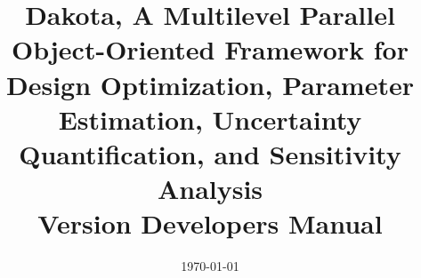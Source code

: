 \documentclass[ps2pdf,11pt,report]{SANDreport}
\title{Dakota, A Multilevel Parallel Object-Oriented Framework for 
Design Optimization, Parameter Estimation, Uncertainty Quantification, 
and Sensitivity Analysis\\\vspace{5mm}Version \DakotaVersion\space Developers Manual}
\author{\DakotaAuthorLong}
\date{\today}
\begin{document}
\maketitle

\begin{abstract}
\DakotaAbstractShared
\DakotaAbstractDev
\end{abstract}

\setcounter{page}{3}
\clearemptydoublepage

\tableofcontents
\clearemptydoublepage

\SANDmain 

%   
\end{document}
